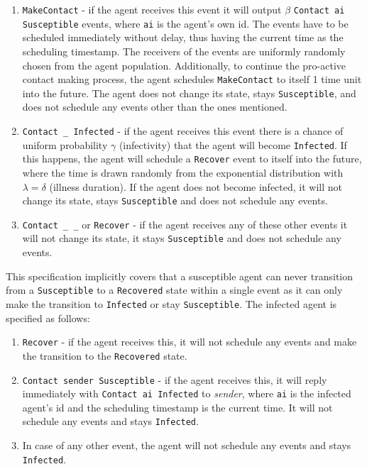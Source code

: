 \begin{enumerate}
	\item \texttt{MakeContact} - if the agent receives this event it will output $\beta$ \texttt{Contact ai Susceptible} events, where \texttt{ai} is the agent's own id. The events have to be scheduled immediately without delay, thus having the current time as the scheduling timestamp. The receivers of the events are uniformly randomly chosen from the agent population. Additionally, to continue the pro-active contact making process, the agent schedules \texttt{MakeContact} to itself 1 time unit into the future. The agent does not change its state, stays \texttt{Susceptible}, and does not schedule any events other than the ones mentioned. 
	
	\item \texttt{Contact \_ Infected} - if the agent receives this event there is a chance of uniform probability $\gamma$ (infectivity) that the agent will become \texttt{Infected}. If this happens, the agent will schedule a \texttt{Recover} event to itself into the future, where the time is drawn randomly from the exponential distribution with $\lambda = \delta$ (illness duration). If the agent does not become infected, it will not change its state, stays \texttt{Susceptible} and does not schedule any events.
	
	\item \texttt{Contact \_ \_} or \texttt{Recover} - if the agent receives any of these other events it will not change its state, it stays \texttt{Susceptible} and does not schedule any events.
\end{enumerate}

This specification implicitly covers that a susceptible agent can never transition from a \texttt{Susceptible} to a \texttt{Recovered} state within a single event as it can only make the transition to \texttt{Infected} or stay \texttt{Susceptible}. The infected agent is specified as follows:

\begin{enumerate}
	\item \texttt{Recover} - if the agent receives this, it will not schedule any events and make the transition to the \texttt{Recovered} state.
	
	\item \texttt{Contact sender Susceptible} - if the agent receives this, it will reply immediately with \texttt{Contact ai Infected} to \textit{sender}, where \texttt{ai} is the infected agent's id and the scheduling timestamp is the current time. It will not schedule any events and stays \texttt{Infected}.
	
	\item In case of any other event, the agent will not schedule any events and stays \texttt{Infected}.
\end{enumerate}

